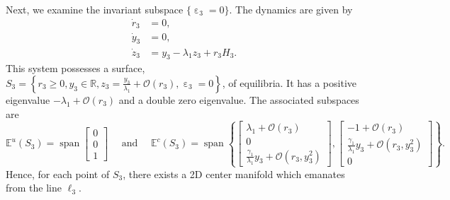 \documentclass[10pt,onecolumn]{article}
\theoremstyle{plain}
\DeclareMathOperator{\eps}{\varepsilon}
\begin{document}
Next, we examine the invariant subspace $\{ \eps_3 = 0 \}$. The dynamics are given by
%
\begin{equation}
  \begin{split}
    \dot r_3 &= 0, \\ 
    \dot y_3 &= 0, \\ 
    \dot z_3 &= y_3 - \lambda_1 z_3 + r_3 H_3.
  \end{split}
\end{equation}
%
This system possesses a surface, $S_3 = \left\{ r_3 \geq 0, y_3 \in \mathbb R, z_3 = \tfrac{y_3}{\lambda_1} + \mathcal O(r_3), \eps_3 = 0 \right\}$, of equilibria. It has a positive eigenvalue $-\lambda_1 + \mathcal O(r_3)$ and a double zero eigenvalue. The associated subspaces are 
%
\[ \mathbb E^u (S_3) = \operatorname{span} \begin{bmatrix} 0 \\ 0 \\1 \end{bmatrix} \quad \text{ and } \quad
\mathbb E^c (S_3) = \operatorname{span} \left\{ \begin{bmatrix} \lambda_1 + \mathcal O(r_3) \\ 0 \\ \tfrac{\gamma_1}{\lambda_1} y_3 + \mathcal O(r_3,y_3^2) \end{bmatrix}, \begin{bmatrix} -1+\mathcal O(r_3) \\ \tfrac{\gamma_1}{\lambda_1} y_3 + \mathcal O(r_3,y_3^2) \\ 0 \end{bmatrix} \right\}.
\]
%
Hence, for each point of $S_3$, there exists a 2D center manifold which emanates from the line $\ell_3$.
\end{document}
